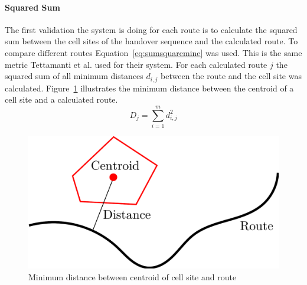 \documentclass[master,english]{hgbthesis}
\begin{document}
\paragraph{Squared Sum}
The first validation the system is doing for each route is to calculate the squared sum between the cell sites of the handover sequence and the calculated route. To compare different routes Equation~\ref{eq:sumsquaremine} was used. This is the same metric Tettamanti et al.\cite{Tettamanti2010} used for their system. For each calculated route $j$ the squared sum of all minimum distances $d_{i,j}$  between the route and the cell site was calculated. Figure~\ref{fig:rms} illustrates the minimum distance between the centroid of a cell site and a calculated route.
\begin{equation}
	\label{eq:sumsquaremine}
	D_j=\sum_{i=1}^{m} d_{i,j}^{2}
\end{equation}
\begin{figure}
	\centering
	\includegraphics[width=0.7\linewidth]{./images/rms}
	\caption{Minimum distance between centroid of cell site and route}
	\label{fig:rms}
\end{figure}
\end{document}
